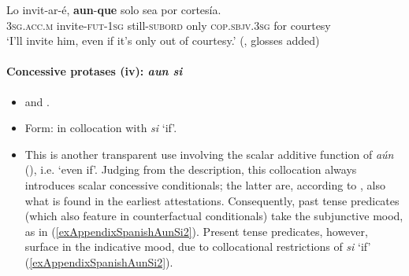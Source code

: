 \begin{exe}
	\ex\label{exAppendixSpanishAunqueScalarConcessiveConditional3}
	\gll Lo invit-ar-é, \textbf{aun}-\textbf{que} solo sea por cortesía.\\
	3\textsc{sg}.\textsc{acc}.\textsc{m} invite-\textsc{fut}-1\textsc{sg} still-\textsc{subord} only \textsc{cop}.\textsc{sbjv}.3\textsc{sg} for courtesy\\
	\glt \lq I'll invite him, even if it's only out of courtesy.' (\cite[§47.12p]{RAEGramatica}, glosses added)
\end{exe}

\paragraph{Concessive protases (iv): \textit{aun si}}
\label{appendixSpanishConcessiveAunSi}
\begin{itemize}
	\item \textcite{Elvira2005} and \textcite[§47.2o]{RAEGramatica}.
	\item Form: in collocation with \textit{si} \lq if'.
	\item This is another transparent use involving the scalar additive function of \textit{aún} (), i.e. \lq even if'. Judging from the description, this collocation always introduces scalar concessive conditionals; the latter are, according to \textcite{Elvira2005}, also what is found in the earliest attestations. Consequently, past tense predicates (which also feature in counterfactual conditionals) take the subjunctive mood, as in (\ref{exAppendixSpanishAunSi2}). Present tense predicates, however, surface in the indicative mood, due to collocational restrictions of \textit{si} \lq if\rq{ }(\ref{exAppendixSpanishAunSi2}).

\end{itemize}
